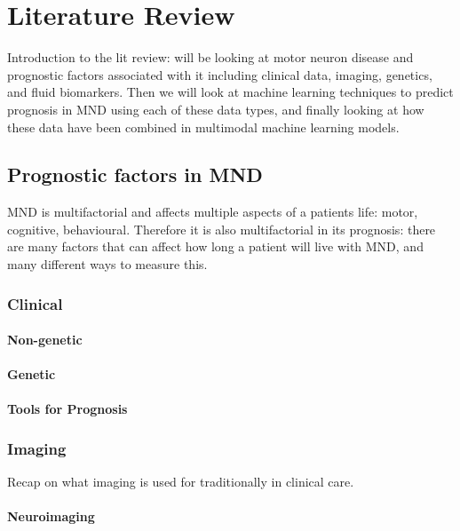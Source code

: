 \chapter{Literature Review}
\label{literature_review}

Introduction to the lit review: will be looking at motor neuron disease and prognostic factors associated with it including clinical data, imaging, genetics, and fluid biomarkers.
Then we will look at machine learning techniques to predict prognosis in MND using each of these data types, and finally looking at how these data have been combined in multimodal machine learning models.

\section{Prognostic factors in MND}

MND is multifactorial and affects multiple aspects of a patients life: motor, cognitive, behavioural.
Therefore it is also multifactorial in its prognosis: there are many factors that can affect how long a patient will live with MND, and many different ways to measure this.


\subsection{Clinical}

\subsubsection{Non-genetic}

\subsubsection{Genetic}

\subsubsection{Tools for Prognosis}

\subsection{Imaging}

Recap on what imaging is used for traditionally in clinical care.

\subsubsection{Neuroimaging}

